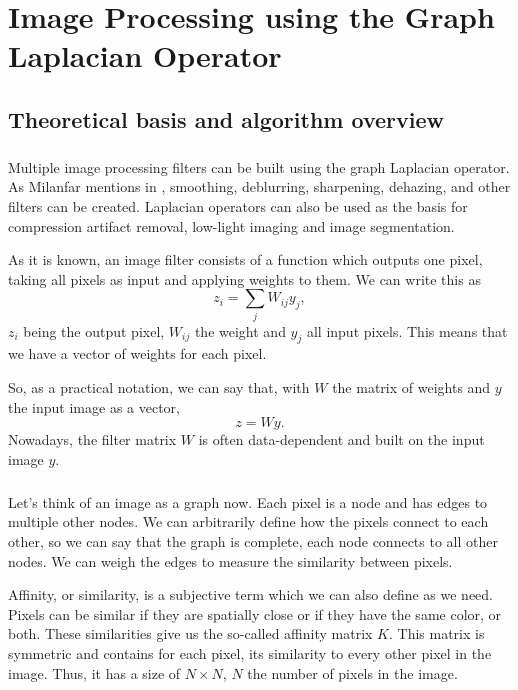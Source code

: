 \chapter{Image Processing using the Graph Laplacian Operator}

\section{Theoretical basis and algorithm overview}

\paragraph{}
Multiple image processing filters can be built using the graph Laplacian operator.
As Milanfar mentions in \cite{siam_slides_2016}, smoothing, deblurring, sharpening, dehazing, and other filters can be created.
Laplacian operators can also be used as the basis for compression artifact removal, low-light imaging and image segmentation.

As it is known, an image filter consists of a function which outputs one pixel, taking all pixels as input and applying weights to them. We can write this as
\[z_i = \sum_j W_{ij}y_j,\]
\(z_i\) being the output pixel, \(W_{ij}\) the weight and \(y_j\) all input pixels.
This means that we have a vector of weights for each pixel.

So, as a practical notation, we can say that, with \(W\) the matrix of weights and \(y\) the input image as a vector,
\[z = Wy.\]
Nowadays, the filter matrix \(W\) is often data-dependent and built on the input image \(y\).

\paragraph{}
Let's think of an image as a graph now.
Each pixel is a node and has edges to multiple other nodes.
We can arbitrarily define how the pixels connect to each other, so we can say that the graph is complete, each node connects to all other nodes.
We can weigh the edges to measure the similarity between pixels.

Affinity, or similarity, is a subjective term which we can also define as we need.
Pixels can be similar if they are spatially close or if they have the same color, or both.
These similarities give us the so-called affinity matrix \(K\).
This matrix is symmetric and contains for each pixel, its similarity to every other pixel in the image.
Thus, it has a size of \(N \times N\), \(N\) the number of pixels in the image.

